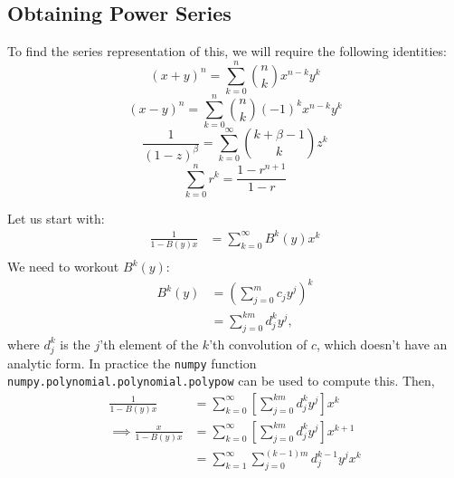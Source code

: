 	\subsection{Obtaining Power Series}
	To find the series representation of this, we will require the following identities:
	\begin{equation}\label{eq:binomial}
		(x + y)^n = \sum_{k=0}^n {n \choose k} x^{n-k}y^k
	\end{equation}
	\begin{equation}\label{eq:sub_binomial}
		(x - y)^n = \sum_{k=0}^n {n \choose k} (-1)^k x^{n-k}y^k
	\end{equation}
	\begin{equation}\label{eq:binomial_special}
		\frac{1}{(1-z)^\beta} = \sum_{k=0}^\infty {k + \beta -1 \choose k} z^k
	\end{equation}
	\begin{equation}\label{eq:geometric}
		\sum_{k=0}^n r^k = \frac{1 - r^{n+1}}{1 - r}
	\end{equation}

	Let us start with:
	\begin{align}
		\frac{1}{1- B(y)x} &= \sum_{k=0}^\infty B^k(y)x^k \\
	\end{align}
	We need to workout $B^k(y)$:
	\begin{align}
		B^k(y) &= \left( \sum_{j=0}^m c_j y^j\right)^k \\
		&= \sum_{j=0}^{km} d_j^k y^j,
	\end{align}
	where $d_j^k$ is the $j$'th element of the $k$'th convolution of $c$, which doesn't have an analytic form. In practice the \texttt{numpy} function \texttt{numpy.polynomial.polynomial.polypow} can be used to compute this. Then,
	\begin{align}
		\frac{1}{1-B(y)x} &= \sum_{k=0}^\infty \left[ \sum_{j=0}^{km} d_j^k y^j \right] x^k \\
		\implies\frac{x}{1-B(y)x} &= \sum_{k=0}^\infty \left[ \sum_{j=0}^{km} d_j^k y^j \right] x^{k+1} \\
		&= \sum_{k=1}^\infty \sum_{j=0}^{(k-1)m} d_j^{k-1} y^j x^k
	\end{align}

